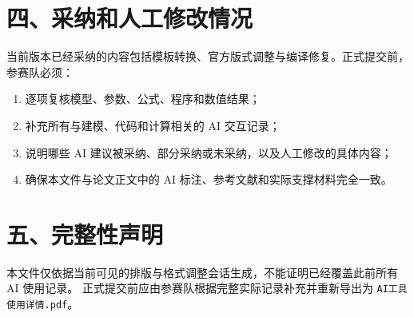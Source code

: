 \documentclass[a4paper,11pt]{ctexart}
\begin{document}
\section*{四、采纳和人工修改情况}
当前版本已经采纳的内容包括模板转换、官方版式调整与编译修复。正式提交前，参赛队必须：
\begin{enumerate}[leftmargin=2.5em]
\item 逐项复核模型、参数、公式、程序和数值结果；
\item 补充所有与建模、代码和计算相关的 AI 交互记录；
\item 说明哪些 AI 建议被采纳、部分采纳或未采纳，以及人工修改的具体内容；
\item 确保本文件与论文正文中的 AI 标注、参考文献和实际支撑材料完全一致。
\end{enumerate}

\section*{五、完整性声明}
本文件仅依据当前可见的排版与格式调整会话生成，不能证明已经覆盖此前所有 AI 使用记录。
正式提交前应由参赛队根据完整实际记录补充并重新导出为 \texttt{AI工具使用详情.pdf}。
\end{document}
